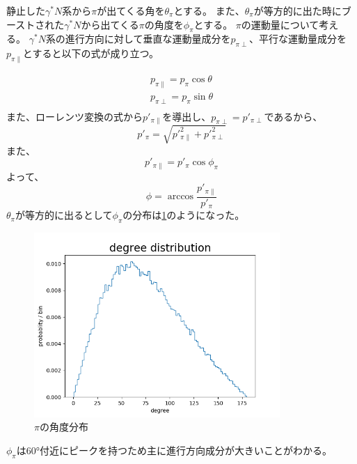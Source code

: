 静止した$\gamma^* N$系から$\pi$が出てくる角を$\theta_\pi$とする。
また、$\theta_\pi$が等方的に出た時にブーストされた$\gamma^* N$から出てくる$\pi$の角度を$\phi_\pi$とする。
$\pi$の運動量について考える。
$\gamma^* N$系の進行方向に対して垂直な運動量成分を$p_{\pi \perp}$、平行な運動量成分を$p_{\pi \parallel}$とすると以下の式が成り立つ。

\begin{eqnarray}
    p_{\pi \parallel} = p_\pi  \cos\theta \\
    p_{\pi \perp} = p_\pi \sin\theta \\
\end{eqnarray}
また、ローレンツ変換の式から$p'_{\pi \parallel}$を導出し、$p_{\pi \perp} = p'_{\pi \perp}$であるから、
\begin{equation}
    p'_\pi = \sqrt{p'^2_{\pi \parallel} + p'^2_{\pi \perp} }
\end{equation}
また、
\begin{equation}
    p'_{\pi \parallel} = p'_\pi \cos{\phi_\pi}
\end{equation}
よって、
\begin{equation}
    \phi = \arccos{\dfrac{p'_{\pi \parallel}}{p'_\pi}}
\end{equation}
$\theta_\pi$が等方的に出るとして$\phi_\pi$の分布は\ref{fig:angle8}のようになった。
\begin{figure}[H]
    \centering
    \includegraphics[height=7cm]{img/degree_distribution.png}
    \caption{$\pi$の角度分布}
    \label{fig:angle8}
\end{figure}
$\phi_\pi$は60°付近にピークを持つため主に進行方向成分が大きいことがわかる。